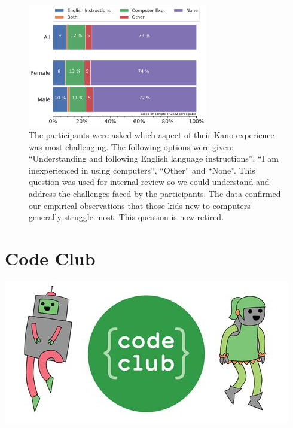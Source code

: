 \documentclass[12pt]{report} %
\begin{document}
\begin{figure}[t!]
    \centering
        \includegraphics[width=0.7\textwidth]{bar_challenge}
\caption{\small The participants were asked which aspect of their Kano experience was most challenging. The following options were given: ``Understanding and following English language instructions'', ``I am inexperienced in using computers'', ``Other'' and ``None''. This question was used for internal review so we could understand and address the challenges faced by the participants. The data confirmed our empirical observations that those kids new to computers generally struggle most. This question is now retired.} 
\label{fig:challenge}
\end{figure}



\chapter{Code Club}\label{chapter:codeclub}
\graphicspath{{codeclub_plots/}{images/}} %



\includegraphics[width=0.7\linewidth, left]{codeclub.jpeg}
\end{document}
